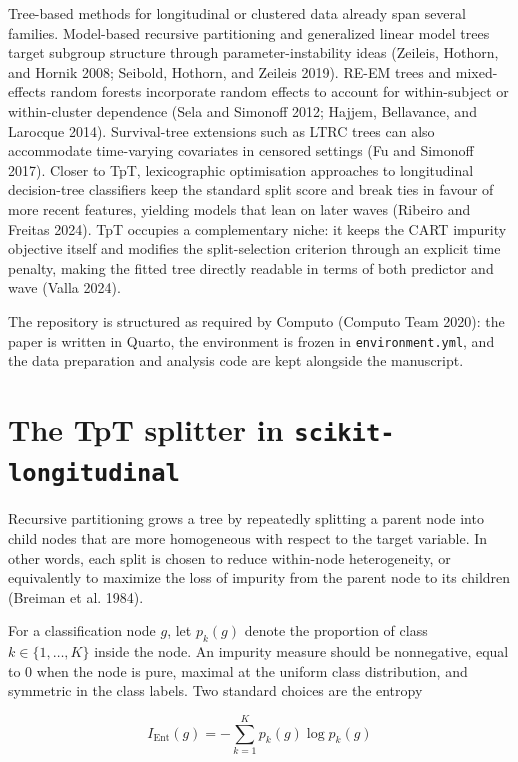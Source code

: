 \documentclass[
]{article}
\begin{document}
Tree-based methods for longitudinal or clustered data already span
several families. Model-based recursive partitioning and generalized
linear model trees target subgroup structure through
parameter-instability ideas (Zeileis, Hothorn, and Hornik 2008; Seibold,
Hothorn, and Zeileis 2019). RE-EM trees and mixed-effects random forests
incorporate random effects to account for within-subject or
within-cluster dependence (Sela and Simonoff 2012; Hajjem, Bellavance,
and Larocque 2014). Survival-tree extensions such as LTRC trees can also
accommodate time-varying covariates in censored settings (Fu and
Simonoff 2017). Closer to TpT, lexicographic optimisation approaches to
longitudinal decision-tree classifiers keep the standard split score and
break ties in favour of more recent features, yielding models that lean
on later waves (Ribeiro and Freitas 2024). TpT occupies a complementary
niche: it keeps the CART impurity objective itself and modifies the
split-selection criterion through an explicit time penalty, making the
fitted tree directly readable in terms of both predictor and wave (Valla
2024).

The repository is structured as required by Computo (Computo Team 2020):
the paper is written in Quarto, the environment is frozen in
\texttt{environment.yml}, and the data preparation and analysis code are
kept alongside the manuscript.

\section{\texorpdfstring{The TpT splitter in
\texttt{scikit-longitudinal}}{The TpT splitter in scikit-longitudinal}}\label{the-tpt-splitter-in-scikit-longitudinal}

Recursive partitioning grows a tree by repeatedly splitting a parent
node into child nodes that are more homogeneous with respect to the
target variable. In other words, each split is chosen to reduce
within-node heterogeneity, or equivalently to maximize the loss of
impurity from the parent node to its children (Breiman et al. 1984).

For a classification node \(g\), let \(p_k(g)\) denote the proportion of
class \(k \in \{1, \ldots, K\}\) inside the node. An impurity measure
should be nonnegative, equal to \(0\) when the node is pure, maximal at
the uniform class distribution, and symmetric in the class labels. Two
standard choices are the entropy

\[
I_{\text{Ent}}(g) = -\sum_{k=1}^{K} p_k(g)\log p_k(g)
\]
\end{document}
